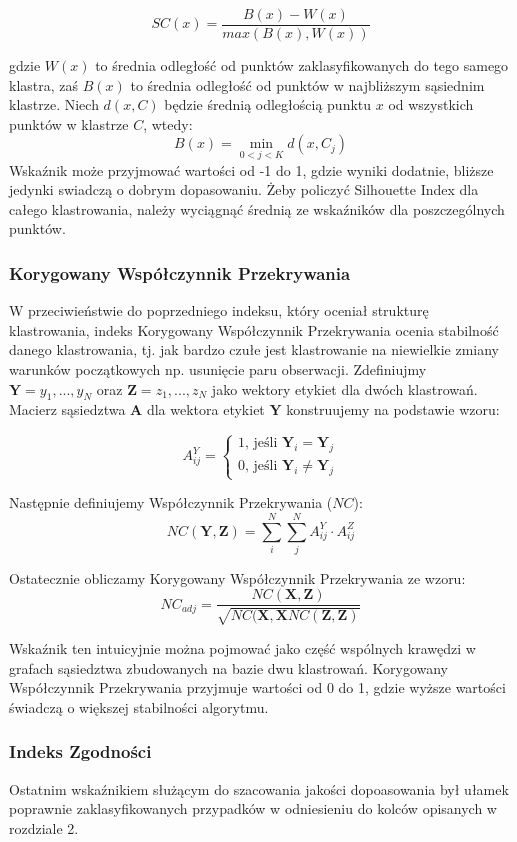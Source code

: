 \documentclass{article}
\begin{document}
\[SC(x) = \frac{B(x) - W(x)}{max(B(x),W(x))}\]

gdzie $W(x)$ to średnia odległość od punktów zaklasyfikowanych do tego samego klastra, zaś $B(x)$ to średnia odległość od punktów w najbliższym sąsiednim klastrze\citep{Rousseeuw1987}.
Niech $d(x, C)$ będzie średnią odległością punktu $x$ od wszystkich punktów w klastrze $C$, wtedy:
\[B(x) = \min_{0 < j < K} d(x, C_j)\]
Wskaźnik może przyjmować wartości od -1 do 1, gdzie wyniki dodatnie, bliższe jedynki swiadczą o dobrym dopasowaniu.
Żeby policzyć Silhouette Index dla całego klastrowania, należy wyciągnąć średnią ze wskaźników dla poszczególnych punktów.

\subsubsection{Korygowany Współczynnik Przekrywania}
\label{roz_neigh_coeff}
W przeciwieństwie do poprzedniego indeksu, który oceniał strukturę klastrowania, indeks Korygowany Współczynnik Przekrywania ocenia stabilność danego klastrowania\citep{Ben-Hur2002}, tj. jak bardzo czułe jest klastrowanie na niewielkie zmiany warunków początkowych np. usunięcie paru obserwacji.
Zdefiniujmy $\textbf{Y} = {y_1, ..., y_N}$ oraz $\textbf{Z} = {z_1, ..., z_N}$ jako wektory etykiet dla dwóch klastrowań. Macierz sąsiedztwa $\textbf{A}$ dla wektora etykiet $\textbf{Y}$ konstruujemy na podstawie wzoru:

$$A^Y_{ij} = \begin{cases}
	1\text{, jeśli} \textbf{ Y}_i = \textbf{Y}_j \\
	0\text{, jeśli}\textbf{ Y}_i \neq \textbf{Y}_j
\end{cases}$$

Następnie definiujemy Współczynnik Przekrywania ($NC$):
$$NC(\textbf{Y}, \textbf{Z}) = \sum_i^N\sum_j^N A^Y_{ij} \cdot A^Z_{ij}$$

Ostatecznie obliczamy Korygowany Współczynnik Przekrywania ze wzoru:
$$NC_{adj} = \frac{NC(\textbf{X},\textbf{Z})}{\sqrt{NC(\textbf{X},\textbf{X}NC(\textbf{Z},\textbf{Z})}}$$

Wskaźnik ten intuicyjnie można pojmować jako część wspólnych krawędzi w grafach sąsiedztwa zbudowanych na bazie dwu klastrowań.
Korygowany Współczynnik Przekrywania przyjmuje wartości od 0 do 1, gdzie wyższe wartości świadczą o większej stabilności algorytmu.
\subsubsection{Indeks Zgodności}
Ostatnim wskaźnikiem służącym do szacowania jakości dopoasowania był ułamek poprawnie zaklasyfikowanych przypadków w odniesieniu do kolców opisanych w rozdziale 2.
\end{document}
